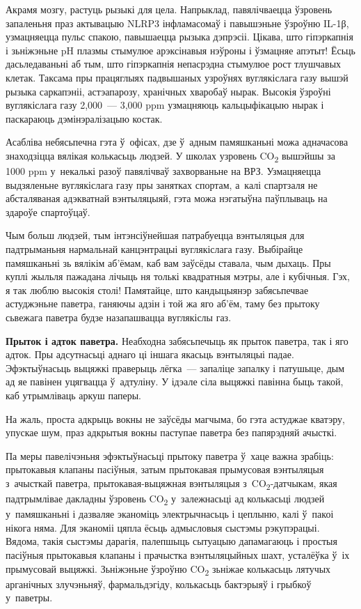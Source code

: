Акрамя мозгу, растуць рызыкі для цела. Напрыклад, павялічваецца ўзровень запаленьня праз актывацыю NLRP3 інфламасомаў і павышэньне ўзроўню IL-1β, узмацняецца пульс спакою, павышаецца рызыка дэпрэсіі. Цікава, што гіпэркапнія і зьніжэньне pH плазмы стымулюе арэксінавыя нэўроны і ўзмацняе апэтыт! Ёсьць дасьледаваньні аб тым, што гіпэркапнія непасрэдна стымулюе рост тлушчавых клетак. Таксама пры працяглыях падвышаных узроўнях вуглякіслага газу вышэй рызыка саркапэніі, астэапарозу, хранічных хваробаў нырак. Высокія ўзроўні вуглякіслага газу 2,000~--- 3,000 ppm узмацняюць кальцыфікацыю нырак і паскараюць дэмінэралізацыю костак.

Асабліва небясьпечна гэта ў~офісах, дзе ў~адным памяшканьні можа адначасова знаходзіцца вялікая колькасьць людзей. У школах узровень CO\textsubscript{2} вышэйшы за 1000 ppm у~некалькі разоў павялічваў захворваньне на ВРЗ. Узмацняецца выдзяленьне вуглякіслага газу пры занятках спортам, а~калі спартзаля не абсталяваная адэкватнай вэнтыляцыяй, гэта можа нэгатыўна паўплываць на здароўе спартоўцаў.

Чым больш людзей, тым інтэнсіўнейшая патрабуецца вэнтыляцыя для падтрыманьня нармальнай канцэнтрацыі вуглякіслага газу. Выбірайце памяшканьні зь вялікім аб'ёмам, каб вам заўсёды ставала, чым дыхаць. Пры куплі жыльля пажадана лічыць ня толькі квадратныя мэтры, але і кубічныя. Гэх, я так люблю высокія столі! Памятайце, што кандыцыянэр забясьпечвае астуджэньне паветра, ганяючы адзін і той жа яго аб'ём, таму без прытоку сьвежага паветра будзе назапашвацца вуглякіслы газ.

\textbf{Прыток і адток паветра.} Неабходна забясьпечыць як прыток паветра, так і яго адток. Пры адсутнасьці аднаго ці іншага якасьць вэнтыляцыі падае. Эфэктыўнасьць выцяжкі праверыць лёгка~--- запаліце запалку і патушыце, дым ад яе павінен уцягвацца ў~адтуліну. У ідэале сіла выцяжкі павінна быць такой, каб утрымліваць аркуш паперы.


На жаль, проста адкрыць вокны не заўсёды магчыма, бо гэта астуджае кватэру, упускае шум, праз адкрытыя вокны паступае паветра без папярэдняй ачысткі.

Па меры павелічэньня эфэктыўнасьці прытоку паветра ў~хаце важна зрабіць: прытокавыя клапаны пасіўныя, затым прытокавая прымусовая вэнтыляцыя з~ачысткай паветра, прытокавая-выцяжная вэнтыляцыя з~CO\textsubscript{2}-датчыкам, якая падтрымлівае дакладны ўзровень CO\textsubscript{2} у~залежнасьці ад колькасьці людзей у~памяшканьні і дазваляе эканоміць электрычнасьць і цеплыню, калі ў~пакоі нікога няма. Для эканоміі цяпла ёсьць адмысловыя сыстэмы рэкупэрацыі. Вядома, такія сыстэмы дарагія, палепшыць сытуацыю дапамагаюць і простыя пасіўныя прытокавыя клапаны і прачыстка вэнтыляцыйных шахт, усталёўка ў~іх прымусовай выцяжкі. Зьніжэньне ўзроўню CO\textsubscript{2} зьніжае колькасьць лятучых арганічных злучэньняў, фармальдэгіду, колькасьць бактэрыяў і грыбкоў у~паветры.

